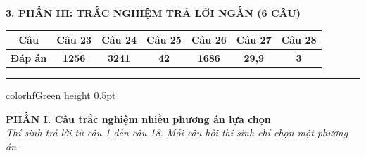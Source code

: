 \documentclass[11pt,a4paper]{article}
\begin{document}
\vspace{2pt}
\noindent
\textbf{\color{mainGreen}3. PHẦN III: TRẮC NGHIỆM TRẢ LỜI NGẮN (6 CÂU)}
\begin{center}
\renewcommand{\arraystretch}{1.2}
\begin{tabular}{|c|c|c|c|c|c|c|}
\hline
\rowcolor{tableGreen}
\textbf{Câu} & \textbf{Câu 23} & \textbf{Câu 24} & \textbf{Câu 25} & \textbf{Câu 26} & \textbf{Câu 27} & \textbf{Câu 28} \\
\hline
\textbf{Đáp án} & \textbf{\color{hfRed}1256} & \textbf{\color{hfRed}3241} & \textbf{\color{hfRed}42} & \textbf{\color{hfRed}1686} & \textbf{\color{hfRed}29,9} & \textbf{\color{hfRed}3} \\
\hline
\end{tabular}
\end{center}

\vspace{4pt}
\hrule color{hfGreen} height 0.5pt

\vspace{4pt}
\noindent
{\color{mainGreen}\textbf{\large PHẦN I. Câu trắc nghiệm nhiều phương án lựa chọn}}\\
\textit{\small Thí sinh trả lời từ câu 1 đến câu 18. Mỗi câu hỏi thí sinh chỉ chọn một phương án.}
\vspace{2pt}
\end{document}
